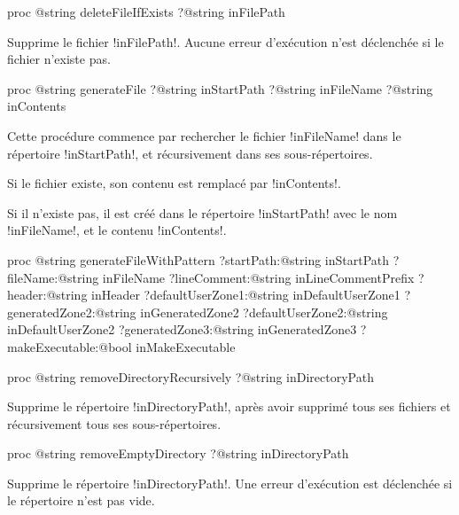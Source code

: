 

\begin{galgasbox}
proc @string deleteFileIfExists ?@string inFilePath
\end{galgasbox}

Supprime le fichier \ggs!inFilePath!. Aucune erreur d'exécution n'est déclenchée si le fichier n'existe pas.








\begin{galgasbox}
proc @string generateFile
   ?@string inStartPath
   ?@string inFileName
   ?@string inContents
\end{galgasbox}

Cette procédure commence par rechercher le fichier \ggs!inFileName! dans le répertoire \ggs!inStartPath!, et récursivement dans ses sous-répertoires.

Si le fichier existe, son contenu est remplacé par \ggs!inContents!.

Si il n'existe pas, il est créé dans le répertoire \ggs!inStartPath! avec le nom \ggs!inFileName!, et le contenu \ggs!inContents!.










\begin{galgasbox}
proc @string generateFileWithPattern
   ?startPath:@string inStartPath
   ?fileName:@string inFileName
   ?lineComment:@string inLineCommentPrefix
   ?header:@string inHeader
   ?defaultUserZone1:@string inDefaultUserZone1
   ?generatedZone2:@string inGeneratedZone2
   ?defaultUserZone2:@string inDefaultUserZone2
   ?generatedZone3:@string inGeneratedZone3
   ?makeExecutable:@bool inMakeExecutable
\end{galgasbox}








\begin{galgasbox}
proc @string removeDirectoryRecursively ?@string inDirectoryPath
\end{galgasbox}

Supprime le répertoire \ggs!inDirectoryPath!, après avoir supprimé tous ses fichiers et récursivement tous ses sous-répertoires.









\begin{galgasbox}
proc @string removeEmptyDirectory ?@string inDirectoryPath
\end{galgasbox}

Supprime le répertoire \ggs!inDirectoryPath!. Une erreur d'exécution est déclenchée si le répertoire n'est pas vide.


